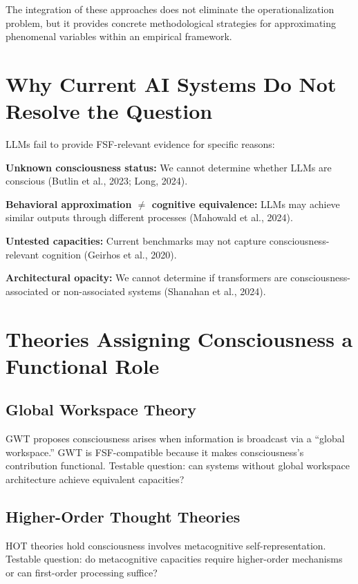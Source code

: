 \documentclass[12pt,a4paper]{article}
\begin{document}
The integration of these approaches does not eliminate the operationalization problem, but it provides concrete methodological strategies for approximating phenomenal variables within an empirical framework.

\section{Why Current AI Systems Do Not Resolve the Question}

LLMs fail to provide FSF-relevant evidence for specific reasons:

\textbf{Unknown consciousness status:} We cannot determine whether LLMs are conscious (Butlin et al., 2023; Long, 2024).

\textbf{Behavioral approximation $\neq$ cognitive equivalence:} LLMs may achieve similar outputs through different processes (Mahowald et al., 2024).

\textbf{Untested capacities:} Current benchmarks may not capture consciousness-relevant cognition (Geirhos et al., 2020).

\textbf{Architectural opacity:} We cannot determine if transformers are consciousness-associated or non-associated systems (Shanahan et al., 2024).

\section{Theories Assigning Consciousness a Functional Role}

\subsection{Global Workspace Theory}

GWT proposes consciousness arises when information is broadcast via a ``global workspace.'' GWT is FSF-compatible because it makes consciousness's contribution functional. Testable question: can systems without global workspace architecture achieve equivalent capacities?

\subsection{Higher-Order Thought Theories}

HOT theories hold consciousness involves metacognitive self-representation. Testable question: do metacognitive capacities require higher-order mechanisms or can first-order processing suffice?
\end{document}
